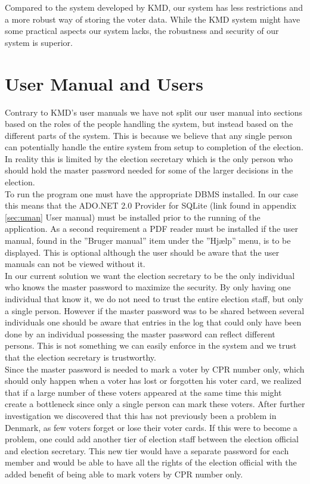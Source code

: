 \documentclass[a4paper]{report}
\begin{document}
Compared to the system developed by KMD, our system has less restrictions and a more robust way of storing the voter data. While the KMD system might have some practical aspects our system lacks, the robustness and security of our system is superior.

\chapter{User Manual and Users}
Contrary to KMD's user manuals \cite{kmd1}\cite{kmd2}\cite{kmd3} we have not split our user manual into sections based on the roles of the people handling the system, but instead based on the different parts of the system. This is because we believe that any single person can potentially handle the entire system from setup to completion of the election. In reality this is limited by the election secretary which is the only person who should hold the master password needed for some of the larger decisions in the election. \\

To run the program one must have the appropriate DBMS installed. In our case this means that the ADO.NET 2.0 Provider for SQLite (link found in appendix \ref{sec:uman} User manual) must be installed prior to the running of the application. As a second requirement a PDF reader must be installed if the user manual, found in the ''Bruger manual'' item under the ''Hj\ae lp'' menu, is to be displayed. This is optional although the user should be aware that the user manuals can not be viewed without it. \\

In our current solution we want the election secretary to be the only individual who knows the master password to maximize the security. By only having one individual that know it, we do not need to trust the entire election staff, but only a single person. However if the master password was to be shared between several individuals one should be aware that entries in the log that could only have been done by an individual possessing the master password can reflect different persons. This is not something we can easily enforce in the system and we trust that the election secretary is trustworthy.\\

Since the master password is needed to mark a voter by CPR number only, which should only happen when a voter has lost or forgotten his voter card, we realized that if a large number of these voters appeared at the same time this might create a bottleneck since only a single person can mark these voters. After further investigation we discovered that this has not previously been a problem in Denmark, as few voters forget or lose their voter cards. If this were to become a problem, one could add another tier of election staff between the election official and election secretary. This new tier would have a separate password for each member and would be able to have all the rights of the election official with the added benefit of being able to mark voters by CPR number only. \\
\end{document}
